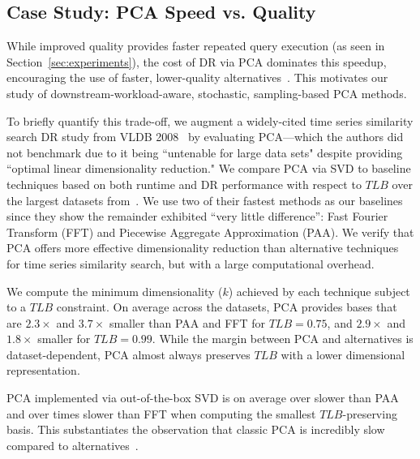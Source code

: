 

\subsection{Case Study: PCA Speed vs. Quality}

While improved quality provides faster repeated query execution (as seen in Section~\ref{sec:experiments}), the cost of DR via PCA dominates this speedup, encouraging the use of faster, lower-quality alternatives~\cite{keogh-study}. 
This motivates our study of downstream-workload-aware, stochastic, sampling-based PCA methods.

To briefly quantify this trade-off, we augment a widely-cited time series similarity search DR study from VLDB 2008~\cite{keogh-study} by evaluating PCA---which the authors did not benchmark due to it being ``untenable for large data sets" despite providing ``optimal linear dimensionality reduction."
We compare PCA via SVD to baseline techniques based on both runtime and DR performance with respect to $TLB$ over the largest datasets from~\cite{keogh-study}. 
We use two of their fastest methods as our baselines since they show the remainder exhibited ``very little difference'': Fast Fourier Transform (FFT) and Piecewise Aggregate Approximation (PAA).
We verify that PCA offers more effective dimensionality reduction than alternative techniques for time series similarity search, but with a large computational overhead. 


We compute the minimum dimensionality ($k$) achieved by each technique subject to a $TLB$ constraint. 
On average across the datasets, PCA provides bases that are $2.3\times$ and $3.7\times$  smaller than PAA and FFT for $TLB = 0.75$, and $2.9\times$ and $1.8\times$ smaller for $TLB = 0.99$.
While the margin between PCA and alternatives is dataset-dependent, PCA almost always preserves $TLB$ with a lower dimensional representation.

%

PCA implemented via out-of-the-box SVD is on average over  slower than PAA and over  times slower than FFT when computing the smallest $TLB$-preserving basis.
This substantiates the observation that classic PCA is incredibly slow compared to alternatives~\cite{keogh-study}. 


